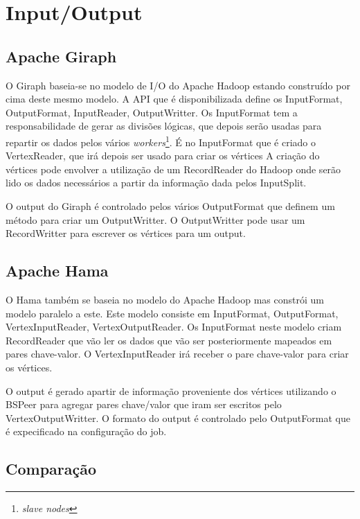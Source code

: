 \newpage
\section*{Input/Output}

\subsection*{Apache Giraph}
O Giraph baseia-se no modelo de I/O do Apache Hadoop estando construído por cima deste mesmo modelo.
A API que é disponibilizada define os InputFormat, OutputFormat, InputReader, OutputWritter.
Os InputFormat tem a responsabilidade de gerar as divisões lógicas, que depois serão usadas para repartir os dados pelos vários
\textit{workers}\footnote{\textit{slave nodes}}. É no InputFormat que é criado o VertexReader, que irá depois ser usado para criar os vértices
A criação do vértices pode envolver a utilização de um RecordReader do Hadoop onde serão lido os dados necessários a partir da informação dada pelos
InputSplit.

O output do Giraph é controlado pelos vários OutputFormat que definem um método para criar um OutputWritter. O OutputWritter pode usar um RecordWritter
para escrever os vértices para um output.

\subsection*{Apache Hama}

O Hama também se baseia no modelo do Apache Hadoop mas constrói um modelo paralelo a este.
Este modelo consiste em InputFormat, OutputFormat, VertexInputReader, VertexOutputReader. Os InputFormat neste modelo criam RecordReader 
que vão ler os dados que vão ser posteriormente mapeados em pares chave-valor. O VertexInputReader irá receber o pare chave-valor para criar os
vértices.

O output é gerado apartir de informação proveniente dos vértices utilizando o BSPeer para agregar pares chave/valor que iram
ser escritos pelo VertexOutputWritter. O formato do output é controlado pelo OutputFormat que é expecificado na
configuração do job.


\subsection*{Comparação}